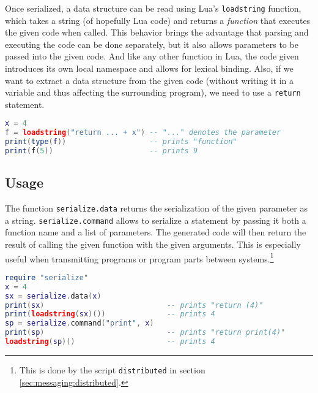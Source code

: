 Once serialized, a data structure can be read using Lua's \texttt{loadstring} function, which takes a string (of hopefully Lua code) and returns a \emph{function} that executes the given code when called. This behavior brings the advantage that parsing and executing the code can be done separately, but it also allows parameters to be passed into the given code. And like any other function in Lua, the code given introduces its own local namespace and allows for lexical binding. Also, if we want to extract a data structure from the given code (without writing it in a variable and thus affecting the surrounding program), we need to use a \texttt{return} statement.

\begin{lstlisting}[language=lua, caption={Using Lua's \texttt{loadstring} function}, label=lst:loadstring, name=lst:loadstring]
x = 4
f = loadstring("return ... + x") -- "..." denotes the parameter
print(type(f))                   -- prints "function"
print(f(5))                      -- prints 9
\end{lstlisting}

\subsection{Usage}
\begin{comment}
TODO: Adjust actual function serialize.command to accept lists of parameters
\end{comment}

The function \texttt{serialize.data} returns the serialization of the given parameter as a string. \texttt{serialize.command} allows to serialize a statement by passing it both a function name and a list of parameters. The generated code will then return the result of calling the given function with the given arguments. This is especially useful when transmitting programs or program parts between systems.\footnote{This is done by the script \texttt{distributed} in section \ref{sec:messaging:distributed}.}

\begin{lstlisting}[language=lua, caption={Using \texttt{serialize.data} and \texttt{serialize.command}}, label=lst:serializedatacommand, name=lst:serializedatacommand]
require "serialize"
x = 4
sx = serialize.data(x)
print(sx)                            -- prints "return (4)"
print(loadstring(sx)())              -- prints 4
sp = serialize.command("print", x)
print(sp)                            -- prints "return print(4)"
loadstring(sp)()                     -- prints 4
\end{lstlisting}

